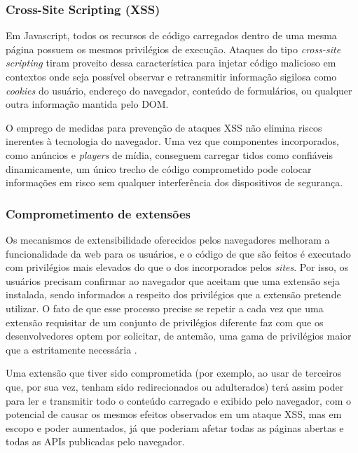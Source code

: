 \subsubsection{Cross-Site Scripting (XSS)}
Em Javascript, todos os recursos de código carregados dentro de uma mesma página possuem os mesmos privilégios de execução. Ataques do tipo \textit{cross-site scripting} tiram proveito dessa característica para injetar código malicioso em contextos onde seja possível observar e retransmitir informação sigilosa como \textit{cookies} do usuário, endereço do navegador, conteúdo de formulários, ou qualquer outra informação mantida pelo DOM.

O emprego de medidas para prevenção de ataques XSS \cite{OWASP:XSS-CheatSheet} não elimina riscos inerentes à tecnologia do navegador. Uma vez que componentes incorporados, como anúncios e \textit{players} de mídia, conseguem carregar {\scripts} tidos como confiáveis dinamicamente, um único trecho de código comprometido pode colocar informações em risco sem qualquer interferência dos dispositivos de segurança.


\subsubsection{Comprometimento de extensões}
Os mecanismos de extensibilidade oferecidos pelos navegadores melhoram a funcionalidade da web para os usuários, e o código de que são feitos é executado com privilégios mais elevados do que o dos {\scripts} incorporados pelos \textit{sites}. Por isso, os usuários precisam confirmar ao navegador que aceitam que uma extensão seja instalada, sendo informados a respeito dos privilégios que a extensão pretende utilizar. O fato de que esse processo precise se repetir a cada vez que uma extensão requisitar de um conjunto de privilégios diferente faz com que os desenvolvedores optem por solicitar, de antemão, uma gama de privilégios maior que a estritamente necessária \cite{Heule2015_Most_Dangerous_Code}.

Uma extensão que tiver sido comprometida (por exemplo, ao usar {\scripts} de terceiros que, por sua vez, tenham sido redirecionados ou adulterados) terá assim poder para ler e transmitir todo o conteúdo carregado e exibido pelo navegador, com o potencial de causar os mesmos efeitos observados em um ataque XSS, mas em escopo e poder aumentados, já que poderiam afetar todas as páginas abertas e todas as APIs publicadas pelo navegador.

\tbc